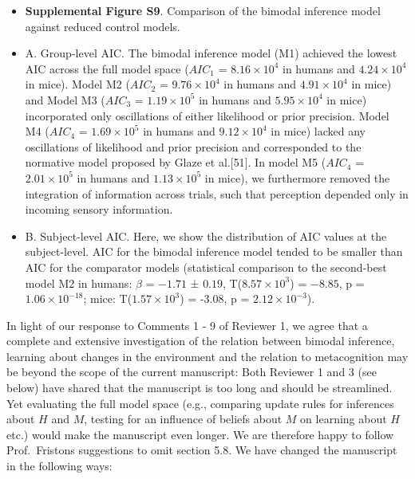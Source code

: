 \documentclass[
]{article}
\begin{document}
\begin{itemize}
\item
  \textbf{Supplemental Figure S9}. Comparison of the bimodal inference
  model against reduced control models.
\item
  A. Group-level AIC. The bimodal inference model (M1) achieved the
  lowest AIC across the full model space (\(AIC_1\) =
  \(\ensuremath{8.16\times 10^{4}}\) in humans and
  \(\ensuremath{4.24\times 10^{4}}\) in mice). Model M2 (\(AIC_2\) =
  \(\ensuremath{9.76\times 10^{4}}\) in humans and
  \(\ensuremath{4.91\times 10^{4}}\) in mice) and Model M3 (\(AIC_3\) =
  \(\ensuremath{1.19\times 10^{5}}\) in humans and
  \(\ensuremath{5.95\times 10^{4}}\) in mice) incorporated only
  oscillations of either likelihood or prior precision. Model M4
  (\(AIC_4\) = \(\ensuremath{1.69\times 10^{5}}\) in humans and
  \(\ensuremath{9.12\times 10^{4}}\) in mice) lacked any oscillations of
  likelihood and prior precision and corresponded to the normative model
  proposed by Glaze et al.{[}51{]}. In model M5 (\(AIC_4\) =
  \(\ensuremath{2.01\times 10^{5}}\) in humans and
  \(\ensuremath{1.13\times 10^{5}}\) in mice), we furthermore removed
  the integration of information across trials, such that perception
  depended only in incoming sensory information.
\item
  B. Subject-level AIC. Here, we show the distribution of AIC values at
  the subject-level. AIC for the bimodal inference model tended to be
  smaller than AIC for the comparator models (statistical comparison to
  the second-best model M2 in humans: \(\beta\) = \(-1.71\) ± \(0.19\),
  T(\(\ensuremath{8.57\times 10^{3}}\)) = \(-8.85\), p =
  \(\ensuremath{1.06\times 10^{-18}}\); mice:
  T(\ensuremath{1.57\times 10^{3}}) = -3.08, p =
  \(\ensuremath{2.12\times 10^{-3}}\)).
\end{itemize}

In light of our response to Comments 1 - 9 of Reviewer 1, we agree that
a complete and extensive investigation of the relation between bimodal
inference, learning about changes in the environment and the relation to
metacognition may be beyond the scope of the current manuscript: Both
Reviewer 1 and 3 (see below) have shared that the manuscript is too long
and should be streamlined. Yet evaluating the full model space (e.g.,
comparing update rules for inferences about \(H\) and \(M\), testing for
an influence of beliefs about \(M\) on learning about \(H\) etc.) would
make the manuscript even longer. We are therefore happy to follow
Prof.~Fristons suggestions to omit section 5.8. We have changed the
manuscript in the following ways:
\end{document}
